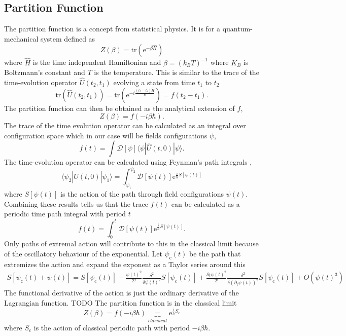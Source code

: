 \documentclass[12pt]{report}
\newcommand{\e}{\ensuremath{\mathrm{e}}}
\renewcommand{\i}{\ensuremath{i}}
\newcommand{\ket}[1]{|#1\rangle}
\newcommand{\bra}[1]{\langle#1|}
\newcommand{\bracket}[3]{\bra{#1}#2\ket{#3}}
\begin{document}
\subsection{Partition Function}
The partition function is a concept from statistical physics. It is for a quantum-mechanical system defined as
\begin{equation}
 Z(\beta)=\mathrm{tr}(\e^{-\beta\hat{H}})
\end{equation}
where $\hat{H}$ is the time independent Hamiltonian and $\beta=(k_BT)^{-1}$ where $K_B$ is Boltzmann's constant and $T$ is the temperature. This is similar to the trace of the time-evolution operator $\hat{U}(t_2,t_1)$ evolving a state from time $t_1$ to $t_2$
\begin{equation}
 \mathrm{tr}(\hat{U}(t_2,t_1))=\mathrm{tr}(\e^{-\i\frac{(t_2-t_1)\hat{H}}{\hbar}})=f(t_2-t_1).
\end{equation}
The partition function can then be obtained as the analytical extension of $f$,
\begin{equation}
 Z(\beta)=f(-\i\beta\hbar).
\end{equation}
The trace of the time evolution operator can be calculated as an integral over configuration space which in our case will be fields configurations $\psi$,
\begin{equation}
 f(t)=\int \mathcal{D}[\psi] \bracket{\psi}{\hat{U}(t,0)}{\psi}.
\end{equation}
The time-evolution operator can be calculated using Feynman's path integrals \cite{feynman1965quantum},
\begin{equation}
 \bracket{\psi_2}{\hat{U}(t,0)}{\psi_1}=\int_{\psi_1}^{\psi_2} \mathcal{D}[\psi(t)]\e^{\frac{\i}{\hbar}S[\psi(t)]}
\end{equation}
where $S[\psi(t)]$ is the action of the path through field configurations $\psi(t)$. Combining these results tells us that the trace $f(t)$ can be calculated as a periodic time path integral with period $t$
\begin{equation}
 f(t)=\int_0^t \mathcal{D}[\psi(t)]\e^{\frac{\i}{\hbar}S[\psi(t)]}.
\end{equation}
Only paths of extremal action will contribute to this in the classical limit because of the oscillatory behaviour of the exponential. Let $\psi_\mathrm{c}(t)$ be the path that extremizes the action and expand the exponent as a Taylor series around this
\begin{equation}
\begin{split}
 S[\psi_\mathrm{c}(t)+\psi(t)]=S[\psi_\mathrm{c}(t)]+\frac{\psi(t)^2}{2!}\frac{\delta^2}{\delta\psi(t)^2} S[\psi_\mathrm{c}(t)]+
\frac{\partial_t\psi(t)^2}{2!}\frac{\delta^2}{\delta(\partial_t\psi(t))^2} S[\psi_\mathrm{c}(t)]+O(\psi(t)^3)
\end{split}
\end{equation}
The functional derivative of the action is just the ordinary derivative of the Lagrangian function. TODO
The partition function is in the classical limit
\begin{equation}
 Z(\beta)=f(-\i\beta\hbar)\underbrace{=}_{classical} \e^{\frac{i}{\hbar}S_c}
\end{equation}
where $S_c$ is the action of classical periodic path with period $-\i\beta\hbar$.
\end{document}
